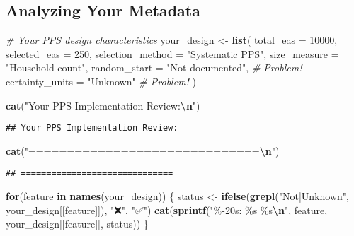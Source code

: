 \documentclass[
]{article}
\newenvironment{Shaded}{\begin{snugshade}}{\end{snugshade}}
\newcommand{\AttributeTok}[1]{\textcolor[rgb]{0.13,0.29,0.53}{#1}}
\newcommand{\CommentTok}[1]{\textcolor[rgb]{0.56,0.35,0.01}{\textit{#1}}}
\newcommand{\ControlFlowTok}[1]{\textcolor[rgb]{0.13,0.29,0.53}{\textbf{#1}}}
\newcommand{\DecValTok}[1]{\textcolor[rgb]{0.00,0.00,0.81}{#1}}
\newcommand{\FunctionTok}[1]{\textcolor[rgb]{0.13,0.29,0.53}{\textbf{#1}}}
\newcommand{\NormalTok}[1]{#1}
\newcommand{\OtherTok}[1]{\textcolor[rgb]{0.56,0.35,0.01}{#1}}
\newcommand{\SpecialCharTok}[1]{\textcolor[rgb]{0.81,0.36,0.00}{\textbf{#1}}}
\newcommand{\StringTok}[1]{\textcolor[rgb]{0.31,0.60,0.02}{#1}}
\begin{document}
\subsection{Analyzing Your Metadata}\label{analyzing-your-metadata}

\begin{Shaded}
\begin{Highlighting}[]
\CommentTok{\# Your PPS design characteristics}
\NormalTok{your\_design }\OtherTok{\textless{}{-}} \FunctionTok{list}\NormalTok{(}
  \AttributeTok{total\_eas =} \DecValTok{10000}\NormalTok{,}
  \AttributeTok{selected\_eas =} \DecValTok{250}\NormalTok{,}
  \AttributeTok{selection\_method =} \StringTok{"Systematic PPS"}\NormalTok{,}
  \AttributeTok{size\_measure =} \StringTok{"Household count"}\NormalTok{,}
  \AttributeTok{random\_start =} \StringTok{"Not documented"}\NormalTok{,  }\CommentTok{\# Problem!}
  \AttributeTok{certainty\_units =} \StringTok{"Unknown"}        \CommentTok{\# Problem!}
\NormalTok{)}

\FunctionTok{cat}\NormalTok{(}\StringTok{"Your PPS Implementation Review:}\SpecialCharTok{\textbackslash{}n}\StringTok{"}\NormalTok{)}
\end{Highlighting}
\end{Shaded}

\begin{verbatim}
## Your PPS Implementation Review:
\end{verbatim}

\begin{Shaded}
\begin{Highlighting}[]
\FunctionTok{cat}\NormalTok{(}\StringTok{"==============================}\SpecialCharTok{\textbackslash{}n}\StringTok{"}\NormalTok{)}
\end{Highlighting}
\end{Shaded}

\begin{verbatim}
## ==============================
\end{verbatim}

\begin{Shaded}
\begin{Highlighting}[]
\ControlFlowTok{for}\NormalTok{(feature }\ControlFlowTok{in} \FunctionTok{names}\NormalTok{(your\_design)) \{}
\NormalTok{  status }\OtherTok{\textless{}{-}} \FunctionTok{ifelse}\NormalTok{(}\FunctionTok{grepl}\NormalTok{(}\StringTok{"Not|Unknown"}\NormalTok{, your\_design[[feature]]), }
                   \StringTok{"❌"}\NormalTok{, }\StringTok{"✅"}\NormalTok{)}
  \FunctionTok{cat}\NormalTok{(}\FunctionTok{sprintf}\NormalTok{(}\StringTok{"\%{-}20s: \%s \%s}\SpecialCharTok{\textbackslash{}n}\StringTok{"}\NormalTok{, feature, your\_design[[feature]], status))}
\NormalTok{\}}
\end{Highlighting}
\end{Shaded}
\end{document}
